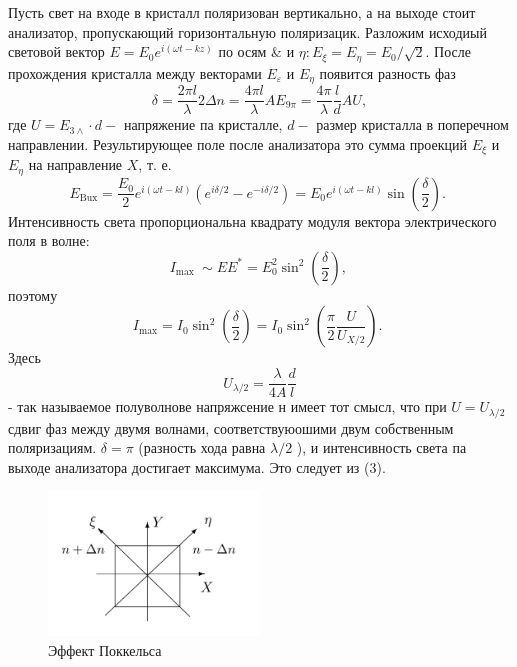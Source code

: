 \documentclass[a4paper, 12pt]{article}
\begin{document}
Пусть свет на входе в кристалл поляризован вертикально, а на выходе стоит анализатор, пропускающий горизонтальную поляризацик. Разложим исходиый световой вектор $E=E_0 e^{i(\omega t-k z)}$ по осям \& и $\eta: E_{\xi}=E_\eta=E_0 / \sqrt{2}$. После прохождения кристалла между векторами $E_{\varepsilon}$ и $E_\eta$ появится разность фаз
\begin{equation*}
\delta=\frac{2 \pi l}{\lambda} 2 \Delta n=\frac{4 \pi l}{\lambda} A E_{9 \pi}=\frac{4 \pi}{\lambda} \frac{l}{d} A U,
\end{equation*}
где $U=E_{3 \wedge} \cdot d-$ напряжение па кристалле, $d-$ размер кристалла в поперечном направлении. Результирующее поле после анализатора это сумма проекций $E_{\xi}$ и $E_\eta$ на направление $X$, т. е.
\begin{equation*}
E_{\mathrm{Bux}}=\frac{E_0}{2} e^{i(\omega t-k l)}\left(e^{i \delta / 2}-e^{-i \delta / 2}\right)=E_0 e^{i(\omega t-k l)} \sin \left(\frac{\delta}{2}\right) \text {. }
\end{equation*}
Интенсивность света пропорциональна квадрату модуля вектора электрического поля в волне:
\begin{equation*}
I_{\text {max }} \sim E E^*=E_0^2 \sin ^2\left(\frac{\delta}{2}\right) \text {, }
\end{equation*}
поэтому
\begin{equation}
I_{\mathrm{max}}=I_0 \sin ^2\left(\frac{\delta}{2}\right)=I_0 \sin ^2\left(\frac{\pi}{2} \frac{U}{U_{X / 2}}\right) \text {. }
\end{equation}
Здесь
\begin{equation}
U_{\lambda / 2}=\frac{\lambda}{4 A} \frac{d}{l}
\end{equation}
- так называемое полуволнове напряжсение н имеет тот смысл, что при $U=U_{\lambda / 2}$ сдвиг фаз между двумя волнами, соответствуюошими двум собственным поляризациям. $\delta=\pi$ (разность хода равна $\lambda / 2$ ), и интенсивность света па выходе анализатора достигает максимума. Это следует из (3).

\begin{figure}[H]
    \centering
    \includegraphics[width=0.5\textwidth]{ris2}
    \caption{Эффект Поккельса}
    \label{fig:ris2}
\end{figure}
\end{document}

